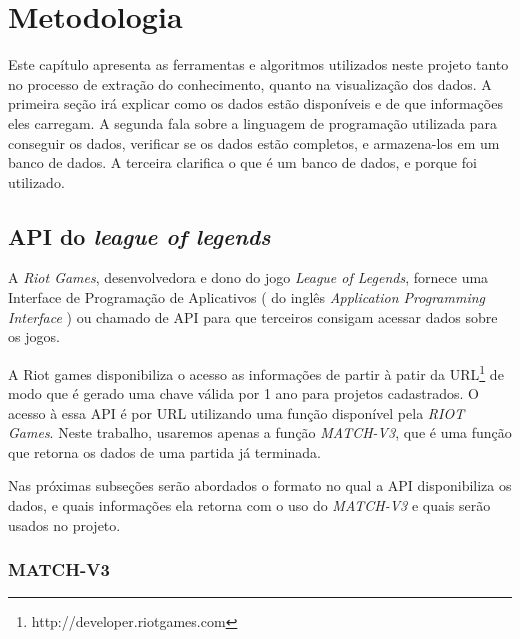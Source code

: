 \chapter{Metodologia}
Este capítulo apresenta as ferramentas e algoritmos utilizados neste projeto tanto no processo de extração do conhecimento, quanto na visualização dos dados.
A primeira seção irá explicar como os dados estão disponíveis e de que informações eles carregam.  A segunda fala sobre a linguagem de programação utilizada para conseguir os dados, verificar se os dados estão completos, e armazena-los em um banco de dados. A terceira clarifica o que é um banco de dados, e porque foi utilizado.

\section{API do \textit{league of legends}}

A \textit{Riot Games}, desenvolvedora e dono do jogo \textit{League of Legends}, fornece uma Interface de Programação de Aplicativos ( do inglês \textit{Application Programming Interface} ) ou chamado de API para que terceiros consigam acessar dados sobre os jogos.

A Riot games disponibiliza o acesso as informações de partir à patir da URL\footnote{http://developer.riotgames.com} de modo que é gerado uma chave válida por 1 ano para projetos cadastrados.
O acesso à essa API é por URL utilizando uma função disponível pela \textit{RIOT Games}. Neste trabalho, usaremos apenas a função \textit{MATCH-V3}, que é uma função que retorna os dados de uma partida já terminada.

Nas próximas subseções serão abordados o formato no qual a API disponibiliza os dados, e quais informações ela retorna com o uso do \textit{MATCH-V3} e quais serão usados no projeto.

\subsection{MATCH-V3}

